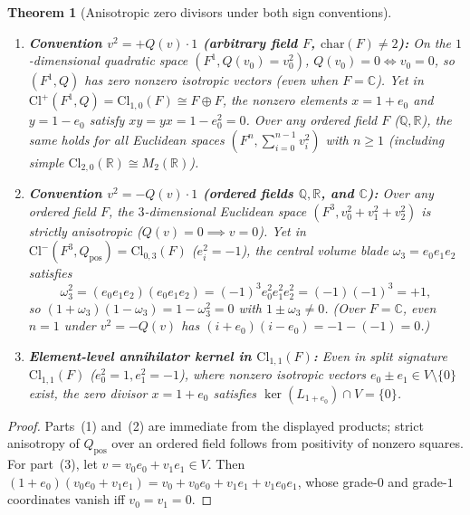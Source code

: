 \documentclass[11pt]{article}
\newtheorem{theorem}{Theorem}[section]
\theoremstyle{definition}
\newcommand{\Cl}{\mathrm{Cl}}
\begin{document}
\begin{theorem}[Anisotropic zero divisors under both sign conventions]
\label{thm:disproof-B}
\leavevmode
\begin{enumerate}
  \item \textbf{Convention $v^2 = +Q(v)\cdot 1$ (arbitrary field $F$, $\mathrm{char}(F) \neq 2$):}
    On the $1$-dimensional quadratic space $(F^1, Q(v_0) = v_0^2)$, $Q(v_0) = 0 \iff v_0 = 0$,
    so $(F^1, Q)$ has \emph{zero} nonzero isotropic vectors (even when $F = \mathbb{C}$).
    Yet in $\Cl^+(F^1, Q) = \Cl_{1,0}(F) \cong F \oplus F$, the nonzero elements
    $x = 1 + e_0$ and $y = 1 - e_0$ satisfy $xy = yx = 1 - e_0^2 = 0$.
    Over any ordered field $F$ ($\mathbb{Q}, \mathbb{R}$), the same holds for all
    Euclidean spaces $(F^n, \sum_{i=0}^{n-1} v_i^2)$ with $n \ge 1$ (including
    simple $\Cl_{2,0}(\mathbb{R}) \cong M_2(\mathbb{R})$).
  \item \textbf{Convention $v^2 = -Q(v)\cdot 1$ (ordered fields $\mathbb{Q}, \mathbb{R}$, and $\mathbb{C}$):}
    Over any ordered field $F$, the $3$-dimensional Euclidean space
    $(F^3, v_0^2 + v_1^2 + v_2^2)$ is strictly anisotropic ($Q(v) = 0 \implies v = 0$).
    Yet in $\Cl^-(F^3, Q_{\mathrm{pos}}) = \Cl_{0,3}(F)$ ($e_i^2 = -1$), the central
    volume blade $\omega_3 = e_0 e_1 e_2$ satisfies
    \[
      \omega_3^2 = (e_0 e_1 e_2)(e_0 e_1 e_2) = (-1)^3 e_0^2 e_1^2 e_2^2
                 = (-1)(-1)^3 = +1,
    \]
    so $(1 + \omega_3)(1 - \omega_3) = 1 - \omega_3^2 = 0$ with $1 \pm \omega_3 \neq 0$.
    (Over $F = \mathbb{C}$, even $n = 1$ under $v^2 = -Q(v)$ has $(i + e_0)(i - e_0) = -1 - (-1) = 0$.)
  \item \textbf{Element-level annihilator kernel in $\Cl_{1,1}(F)$:}
    Even in split signature $\Cl_{1,1}(F)$ ($e_0^2 = 1, e_1^2 = -1$), where nonzero
    isotropic vectors $e_0 \pm e_1 \in V \setminus \{0\}$ exist, the zero divisor
    $x = 1 + e_0$ satisfies $\ker(L_{1 + e_0}) \cap V = \{0\}$.
\end{enumerate}
\end{theorem}
\begin{proof}
Parts~(1) and~(2) are immediate from the displayed products; strict anisotropy of
$Q_{\mathrm{pos}}$ over an ordered field follows from positivity of nonzero squares.
For part~(3), let $v = v_0 e_0 + v_1 e_1 \in V$. Then
$(1 + e_0)(v_0 e_0 + v_1 e_1) = v_0 + v_0 e_0 + v_1 e_1 + v_1 e_0 e_1$, whose
grade-$0$ and grade-$1$ coordinates vanish iff $v_0 = v_1 = 0$.
\end{proof}
\end{document}
